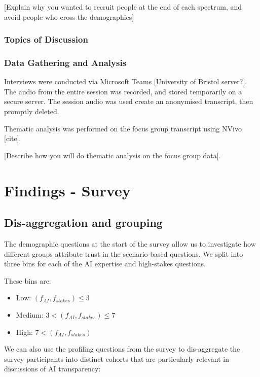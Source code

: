 \documentclass[manuscript,screen,review]{acmart}
\begin{document}
[Explain why you wanted to recruit people at the end of each spectrum, and avoid people who cross the demographics]

\subsubsection{Topics of Discussion}



\subsubsection{Data Gathering and Analysis}
Interviews were conducted via Microsoft Teams [University of Bristol server?]. The audio from the entire session was recorded, and stored temporarily on a secure server. The session audio was used create an anonymised transcript, then promptly deleted. 

Thematic analysis was performed on the focus group transcript using NVivo [cite]. 

[Describe how you will do thematic analysis on the focus group data].








\newpage
\section{Findings - Survey}

\subsection{Dis-aggregation and grouping}

The demographic questions at the start of the survey allow us to investigate how different groups attribute trust in the scenario-based questions. We split into three bins for each of the AI expertise and high-stakes questions. 

These bins are:

\begin{itemize}
    \item Low: $(f_{AI}, f_{stakes}) \leq 3$
    \item Medium: $3 < (f_{AI}, f_{stakes}) \leq 7$
    \item High: $7 < (f_{AI}, f_{stakes})$
\end{itemize}
We can also use the profiling questions from the survey to dis-aggregate the survey participants into distinct cohorts that are particularly relevant in discussions of AI transparency: 
\end{document}
